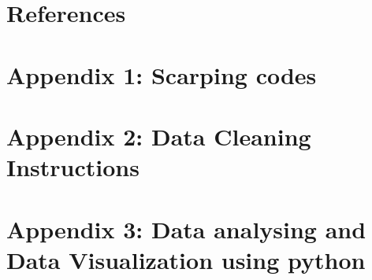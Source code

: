 \documentclass{article}
\begin{document}
\section{References}
\section{Appendix 1: Scarping codes} 
%
%
%
\section{Appendix 2: Data Cleaning Instructions}
%
\section{Appendix 3: Data analysing and Data Visualization using python}
%
\end{document}
